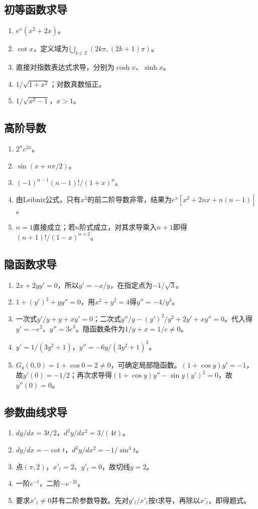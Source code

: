 \documentclass[11pt,a4paper,fontset=fandol]{ctexrep}
\begin{document}
\subsection{初等函数求导}
\begin{enumerate}
\item $e^x(x^2+2x)$。
\item $\cot x$，定义域为$\bigcup_{k\in\mathbb Z}(2k\pi,(2k+1)\pi)$。
\item 直接对指数表达式求导，分别为$\cosh x$、$\sinh x$。
\item $1/\sqrt{1+x^2}$；对数真数恒正。
\item $1/\sqrt{x^2-1}$，$x>1$。
\end{enumerate}
\subsection{高阶导数}
\begin{enumerate}
\item $2^n e^{2x}$。
\item $\sin(x+n\pi/2)$。
\item $(-1)^{n-1}(n-1)!/(1+x)^n$。
\item 由Leibniz公式，只有$x^2$的前二阶导数非零，结果为$e^x[x^2+2nx+n(n-1)]$。
\item $n=1$直接成立；若$n$阶式成立，对其求导乘入$n+1$即得$(n+1)!/(1-x)^{n+2}$。
\end{enumerate}
\subsection{隐函数求导}
\begin{enumerate}
\item $2x+2yy'=0$，所以$y'=-x/y$，在指定点为$-1/\sqrt3$。
\item $1+(y')^2+yy''=0$，用$x^2+y^2=4$得$y''=-4/y^3$。
\item 一次式$y'/y+y+xy'=0$；二次式$y''/y-(y')^2/y^2+2y'+xy''=0$。代入得$y'=-e^2$、$y''=3e^3$。隐函数条件为$1/y+x=1/e\ne0$。
\item $y'=1/(3y^2+1)$，$y''=-6y/(3y^2+1)^3$。
\item $G_y(0,0)=1+\cos0=2\ne0$，可确定局部隐函数。$(1+\cos y)y'=-1$，故$y'(0)=-1/2$；再次求导得$(1+\cos y)y''-\sin y(y')^2=0$，故$y''(0)=0$。
\end{enumerate}
\subsection{参数曲线求导}
\begin{enumerate}
\item $dy/dx=3t/2$，$d^2y/dx^2=3/(4t)$。
\item $dy/dx=-\cot t$，$d^2y/dx^2=-1/\sin^3t$。
\item 点$(\pi,2)$，$x'_t=2$、$y'_t=0$，故切线$y=2$。
\item 一阶$e^{-t}$，二阶$-e^{-2t}$。
\item 要求$x'_t\ne0$并有二阶参数导数。先对$y'_t/x'_t$按$t$求导，再除以$x'_t$，即得题式。
\end{enumerate}
\end{document}
